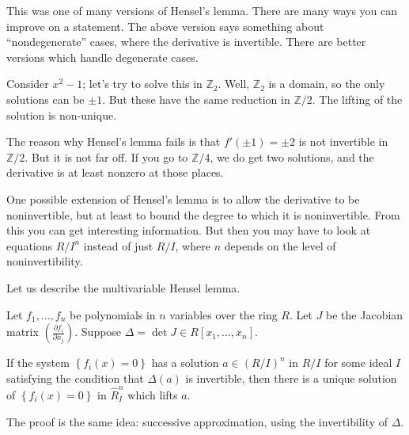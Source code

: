 This was one of many versions of Hensel's lemma. There are many ways you can
improve on a statement. The above version says something about
``nondegenerate'' cases, where the derivative is invertible. There are better
versions which handle degenerate cases.

\begin{example} 
Consider $x^2 - 1$; let's try to solve this in $\mathbb{Z}_2$. Well,
$\mathbb{Z}_2$ is a domain, so the only solutions can be $\pm 1$. But these
have the same reduction in $\mathbb{Z}/2$. The lifting of the solution is
non-unique.

The reason why Hensel's lemma fails is that $f'(\pm 1) = \pm 2$ is not
invertible in $\mathbb{Z}/2$. But it is not far off. If you go to
$\mathbb{Z}/4$, we do get two solutions, and the derivative is at least nonzero
at those places.
\end{example} 

One possible extension of Hensel's lemma is to allow the derivative to be
noninvertible, but at least to bound the degree to which it is noninvertible.
From this you can get interesting information. 
But then you may have to look at equations $R/I^n$ instead of just $R/I$, where
$n$ depends on the level of noninvertibility.

Let us describe the multivariable Hensel lemma.

\begin{theorem} 
Let $f_1, \dots, f_n$ be polynomials in $n$ variables over the ring $R$. Let
$J$ be the Jacobian matrix $( \frac{\partial f_i}{\partial x_j})$. Suppose
$\Delta = \det J \in R[x_1, \dots, x_n]$. 

If the system $\left\{f_i(x) = 0\right\}$ has a solution $a \in (R/I)^n$ in $R/I$ for some
ideal $I$ satisfying the condition that $\Delta(a)$ is invertible, then there
is a unique solution of $\left\{f_i(x) =0\right\}$ in $\hat{R}_I^n$ which lifts $a$. 
\end{theorem} 
The proof is the same idea: successive approximation, using the invertibility
of $\Delta$. 

